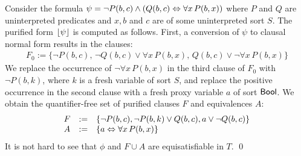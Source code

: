 \documentclass{svjour3}                     %
\begin{document}
\begin{example}
Consider the formula $\psi =  \neg P( b, c ) \wedge ( Q( b, c ) \Leftrightarrow \forall x\, P( b, x ))$
where $P$ and $Q$ are uninterpreted predicates and $x,b$ and $c$ are of some uninterpreted 
sort $S$.
The purified form $\lfloor \psi \rfloor$ is computed as follows.
First, a conversion of $\psi$ to clausal normal form results in the clauses:
\[
\begin{array}{l}
F_0 := \{ \neg P( b, c ),\,
          \neg Q( b, c ) \vee \forall x\, P( b, x ),\,  
          Q( b, c ) \vee \neg \forall x\, P( b, x )
        \}
\end{array}
\]
We replace the occurrence of $\neg \forall x\, P( b, x )$ in the third clause of $F_0$
with $\neg P( b, k )$, where $k$ is a fresh variable of sort $S$,
and replace the positive occurrence in the second clause with
a fresh proxy variable $a$ of sort $\mathsf{Bool}$.
We obtain the quantifier-free set of purified clauses $F$ and equivalences $A$:
\[
\begin{array}{l@{\hspace{1em}}l@{\hspace{1em}}l}
F & := & \{ \neg P( b, c ), \neg P( b, k ) \vee Q( b, c ), a \vee \neg Q( b, c ) \} \\
A & := & \{ a \Leftrightarrow \forall x\, P( b, x ) \}
\end{array}
\]
It is not hard to see that $\phi$ and $F \cup A$ are equisatisfiable in $T$.
\qed
\end{example}
\end{document}
